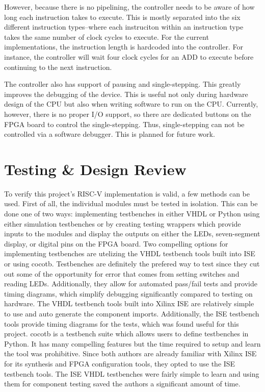 \documentclass[lettersize,journal]{IEEEtran}
\begin{document}
However, because there is no pipelining, the controller needs to be aware of how long each instruction takes to execute.
This is mostly separated into the six different instruction types--where each instruciton within an instruction type takes the same number of clock cycles to execute.
For the current implementations, the instruction length is hardcoded into the controller. For instance, the controller will wait four clock cycles for an ADD to execute
before continuing to the next instruction.

The controller also has support of pausing and single-stepping.
This greatly improves the debugging of the device.
This is useful not only during hardware design of the CPU but also when writing software to run on the CPU.
Currently, however, there is no proper I/O support, so there are dedicated buttons on the FPGA board to control the single-stepping.
Thus, single-stepping can not be controlled via a software debugger.
This is planned for future work.

\section{Testing \& Design Review}
To verify this project's RISC-V implementation is valid, a few methods can be used. First of all, the individual modules must be tested in isolation.
This can be done one of two ways: implementing testbenches in either VHDL or Python using either simulation testbenches or by creating testing wrappers which provide inputs to the modules and display the outputs on either the LEDs, seven-segment display, or digital pins on the FPGA board.
Two compelling options for implementing testbenches are utelizing the VHDL testbench tools built into ISE or using cocotb.
Testbenches are definitely the prefered way to test since they cut out some of the opportunity for error that comes from setting switches and reading LEDs.
Additionally, they allow for automated pass/fail tests and provide timing diagrams, which simplify debugging significantly compared to testing on hardware.
The VHDL testbench tools built into Xilinx ISE are relatively simple to use and auto generate the component imports.
Additionally, the ISE testbench tools provide timing diagrams for the tests, which was found useful for this project.
cocotb is a testbench suite which allows users to define testbenches in Python.
It has many compelling features but the time required to setup and learn the tool was prohibitive.
Since both authors are already familiar with Xilinx ISE for its synthesis and FPGA configuration tools, they opted to use the ISE testbench tools.
The ISE VHDL testbenches were fairly simple to learn and using them for component testing saved the authors a significant amount of time.
\end{document}
